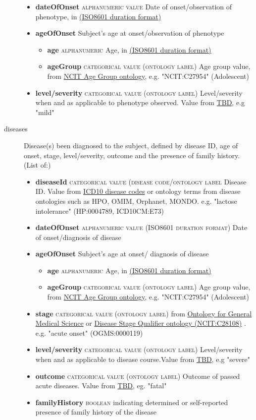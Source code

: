 \documentclass[a4paper, 10pt]{article}        %
\begin{document}
\begin{description}
\begin{itemize}
			\item[] \textbf{dateOfOnset} {\textsc{alphanumeric value}} Date of onset/observation of phenotype, in \href{link}{(ISO8601 duration format)}  
			\item[] \textbf{ageOfOnset} Subject's age at onset/observation of phenotype
			\begin{itemize}
			\item[] \textbf{age} {\textsc{alphanumeric}} Age, in \href{link}{(ISO8601 duration format)}  
			\item[] \textbf{ageGroup} {\textsc{categorical value (ontology label)}} Age group value, from \href{link}{NCIT Age Group ontology}, e.g. "NCIT:C27954" (Adolescent)
			\end{itemize}
			\item[] \textbf{level/severity}  {\textsc{categorical value (ontology label)}} Level/severity when and as applicable to phenotype observed. Value from \href{link}{TBD}, e.g "mild"
	\end{itemize}
	\item[diseases] Disease(s) been diagnosed to the subject, defined by disease ID, age of onset, stage, level/severity, outcome and the presence of family history. (List of:)
	\begin{itemize}
			\item[]  \textbf{diseaseId} {\textsc{categorical value (disease code/ontology label}} Disease ID. Value from \href{link}{ICD10 disease codes} or ontology terms from disease ontologies such as HPO, OMIM, Orphanet, MONDO. e.g. "lactose intolerance" (HP:0004789, ICD10CM:E73)
			\item[] \textbf{dateOfOnset} {\textsc{alphanumeric value (ISO8601 duration format)}} Date of onset/diagnosis of disease
			\item[]  \textbf{ageOfOnset} Subject's age at onset/ diagnosis of disease
			\begin{itemize}
			\item[] \textbf{age} {\textsc{alphanumeric}} Age, in \href{link}{(ISO8601 duration format)}  
			\item[] \textbf{ageGroup} {\textsc{categorical value (ontology label)}} Age group value, from \href{link}{NCIT Age Group ontology}, e.g. "NCIT:C27954" (Adolescent)
			\end{itemize}
			\item[]  \textbf{stage} {\textsc{categorical value (ontology label)}} from  \href{link}{Ontology for General Medical Science} or  \href{link}{Disease Stage Qualifier ontology (NCIT:C28108)} . e.g. "acute onset" (OGMS:0000119)
			\item[] \textbf{level/severity} {\textsc{categorical value (ontology label)}} Level/severity when and as applicable to disease course.Value from \href{link}{TBD}, e.g "severe"
			\item[]  \textbf{outcome} {\textsc{categorical value (ontology label)}} Outcome of passed acute diseases. Value from \href{link}{TBD}, eg. "fatal" 
			\item[] \textbf{familyHistory} {\textsc{boolean}} indicating determined or self-reported presence of family history of the disease
	\end{itemize}


\end{description}
\end{document}
